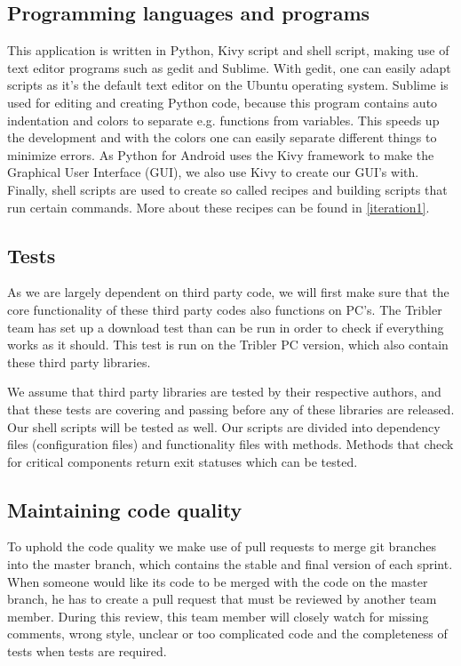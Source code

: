 \subsection{Programming languages and programs}
\label{programminglang}
This application is written in Python, Kivy script and shell script, making use of text editor programs such as gedit and Sublime. With gedit, one can easily adapt scripts as it's the default text editor on the Ubuntu operating system. Sublime is used for editing and creating Python code, because this program contains auto indentation and colors to separate e.g. functions from variables. This speeds up the development and with the colors one can easily separate different things to minimize errors.
As Python for Android uses the Kivy framework to make the Graphical User Interface (GUI), we also use Kivy to create our GUI's with.
Finally, shell scripts are used to create so called recipes and building scripts that run certain commands. More about these recipes can be found in \ref{iteration1}.

\subsection{Tests}
As we are largely dependent on third party code, we will first make sure that the core functionality of these third party codes also functions on PC's. The Tribler team has set up a download test than can be run in order to check if everything works as it should. This test is run on the Tribler PC version, which also contain these third party libraries.

We assume that third party libraries are tested by their respective authors, and that these tests are covering and passing before any of these libraries are released.
Our shell scripts will be tested as well. Our scripts are divided into dependency files (configuration files) and functionality files with methods. Methods that check for critical components return exit statuses which can be tested.

\subsection{Maintaining code quality}
\label{codeQuality}
To uphold the code quality we make use of pull requests to merge git branches into the master branch, which contains the stable and final version of each sprint. When someone would like its code to be merged with the code on the master branch, he has to create a pull request that must be reviewed by another team member. During this review, this team member will closely watch for missing comments, wrong style, unclear or too complicated code and the completeness of tests when tests are required.

